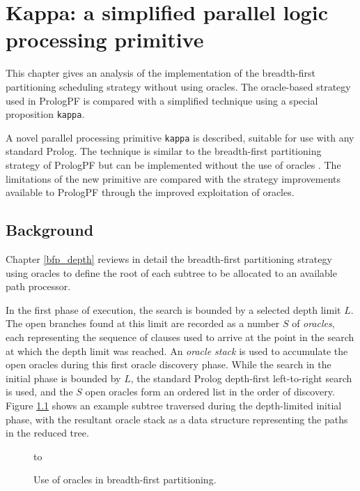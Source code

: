 \chapter{Kappa: a simplified parallel logic processing primitive}
\label{kappa}

This chapter gives an analysis of the implementation of the
breadth-first partitioning scheduling strategy without using
oracles.  The oracle-based strategy used in PrologPF is compared with a
simplified technique using a special proposition \texttt{kappa}.

A novel parallel processing primitive \texttt{kappa}
is described, suitable for use
with any standard Prolog.  The technique is similar to the breadth-first
partitioning strategy of PrologPF but can be implemented without the
use of oracles \cite{CA87}.  The limitations of the new primitive
are compared with the strategy improvements available to PrologPF through
the improved exploitation of oracles.

\section{Background} %

Chapter \ref{bfp_depth} reviews in detail the breadth-first
partitioning strategy using oracles to define the root of each
subtree to be allocated to an available path processor.

In the first phase of execution, the search is bounded by a
selected depth limit $L$.  The open branches found at this limit
are recorded as a number $S$ of \textit{oracles}, each representing the
sequence of clauses used to arrive at the point in the search at which
the depth limit was reached.  An \textit{oracle stack} is used to
accumulate the open oracles during this first oracle discovery phase.
While the search in the initial phase is bounded by $L$,
the standard Prolog depth-first left-to-right search is used, and
the $S$ open oracles form an ordered list in the order
of discovery.  Figure \ref{kappa_bfp} shows an example subtree traversed
during the depth-limited initial phase, with the resultant oracle
stack as a data structure representing the paths in the reduced tree.

\begin{figure}[htbp]
\vspace{5mm} \hbox to 
\caption{Use of oracles in breadth-first partitioning.}
\vspace{5mm}
\label{kappa_bfp}
\end{figure}

